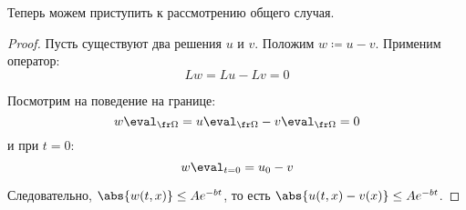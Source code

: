 Теперь можем приступить к рассмотрению общего случая. 

\begin{proof}
  Пусть существуют два решения $u$ и $v$. Положим $w \coloneqq u - v$. Применим оператор:
  \begin{equation}
    Lw = Lu - Lv = 0
  \end{equation}
  
  Посмотрим на поведение на границе:
  \begin{equation}
    w \eval_{\fr \Omega} = u \eval_{\fr \Omega} - v \eval_{\fr \Omega} = 0
  \end{equation}
  и при $t = 0$:
  \begin{equation}
    w \eval_{t = 0} = u_0 - v
  \end{equation}
  
  Следовательно, $\abs{w(t, x)} \le Ae^{-bt}$, то есть $\abs{u(t, x) - v(x)} \le Ae^{-bt}$.
\end{proof}